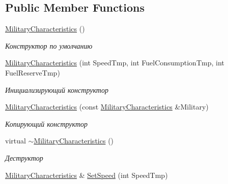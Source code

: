 \subsection*{Public Member Functions}
\begin{DoxyCompactItemize}
\item 
\mbox{\label{class_aircraft_carrier_group_1_1_military_characteristics_a43c76dd547a8abd8f0b43920e891744f}} 
\mbox{\hyperlink{class_aircraft_carrier_group_1_1_military_characteristics_a43c76dd547a8abd8f0b43920e891744f}{Military\+Characteristics}} ()
\begin{DoxyCompactList}\small\item\em Конструктор по умолчанию \end{DoxyCompactList}\item 
\mbox{\hyperlink{class_aircraft_carrier_group_1_1_military_characteristics_a6bd6050279bfeb4b19a65521954a6fd3}{Military\+Characteristics}} (int Speed\+Tmp, int Fuel\+Consumption\+Tmp, int Fuel\+Reserve\+Tmp)
\begin{DoxyCompactList}\small\item\em Инициализирующий конструктор \end{DoxyCompactList}\item 
\mbox{\hyperlink{class_aircraft_carrier_group_1_1_military_characteristics_a3467139f8217e53800e8cb0f72fab64c}{Military\+Characteristics}} (const \mbox{\hyperlink{class_aircraft_carrier_group_1_1_military_characteristics}{Military\+Characteristics}} \&Military)
\begin{DoxyCompactList}\small\item\em Копирующий конструктор \end{DoxyCompactList}\item 
\mbox{\label{class_aircraft_carrier_group_1_1_military_characteristics_adcbeb18ee8db4a3d9f6f858cdc974fc6}} 
virtual \mbox{\hyperlink{class_aircraft_carrier_group_1_1_military_characteristics_adcbeb18ee8db4a3d9f6f858cdc974fc6}{$\sim$\+Military\+Characteristics}} ()
\begin{DoxyCompactList}\small\item\em Деструктор \end{DoxyCompactList}\item 
\mbox{\hyperlink{class_aircraft_carrier_group_1_1_military_characteristics}{Military\+Characteristics}} \& \mbox{\hyperlink{class_aircraft_carrier_group_1_1_military_characteristics_a185dc7a09586db8136fccc33d6b22681}{Set\+Speed}} (int Speed\+Tmp)

\end{DoxyCompactItemize}
